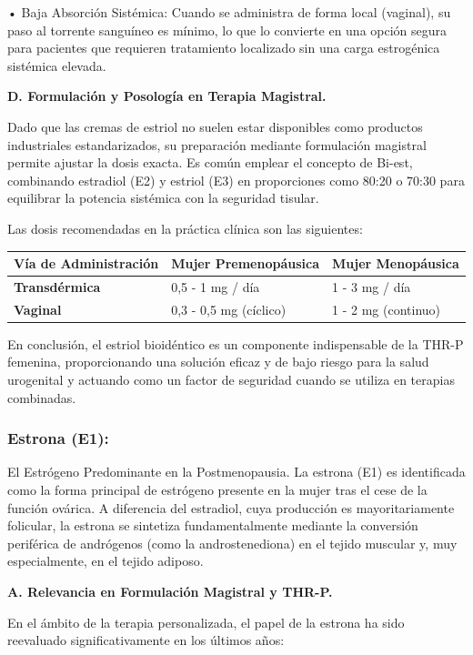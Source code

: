 \documentclass[
  spanish,
]{article}
\begin{document}
• Baja Absorción Sistémica: Cuando se administra de forma local (vaginal), su paso al torrente sanguíneo es mínimo, lo que lo convierte en una opción segura para pacientes que requieren tratamiento localizado sin una carga estrogénica sistémica elevada.

\textbf{D. Formulación y Posología en Terapia Magistral.}

Dado que las cremas de estriol no suelen estar disponibles como productos industriales estandarizados, su preparación mediante formulación magistral permite ajustar la dosis exacta. Es común emplear el concepto de Bi-est, combinando estradiol (E2) y estriol (E3) en proporciones como 80:20 o 70:30 para equilibrar la potencia sistémica con la seguridad tisular.

Las dosis recomendadas en la práctica clínica son las siguientes:

\begin{longtable}[]{@{}lll@{}}
\toprule\noalign{}
Vía de Administración & Mujer Premenopáusica & Mujer Menopáusica \\
\midrule\noalign{}
\endhead
\bottomrule\noalign{}
\endlastfoot
\textbf{Transdérmica} & 0,5 - 1 mg / día & 1 - 3 mg / día \\
\textbf{Vaginal} & 0,3 - 0,5 mg (cíclico) & 1 - 2 mg (continuo) \\
\end{longtable}

En conclusión, el estriol bioidéntico es un componente indispensable de la THR-P femenina, proporcionando una solución eficaz y de bajo riesgo para la salud urogenital y actuando como un factor de seguridad cuando se utiliza en terapias combinadas.

\subsubsection{Estrona (E1):}\label{estrona-e1}

El Estrógeno Predominante en la Postmenopausia.
La estrona (E1) es identificada como la forma principal de estrógeno presente en la mujer tras el cese de la función ovárica. A diferencia del estradiol, cuya producción es mayoritariamente folicular, la estrona se sintetiza fundamentalmente mediante la conversión periférica de andrógenos (como la androstenediona) en el tejido muscular y, muy especialmente, en el tejido adiposo.

\textbf{A. Relevancia en Formulación Magistral y THR-P.}

En el ámbito de la terapia personalizada, el papel de la estrona ha sido reevaluado significativamente en los últimos años:
\end{document}
